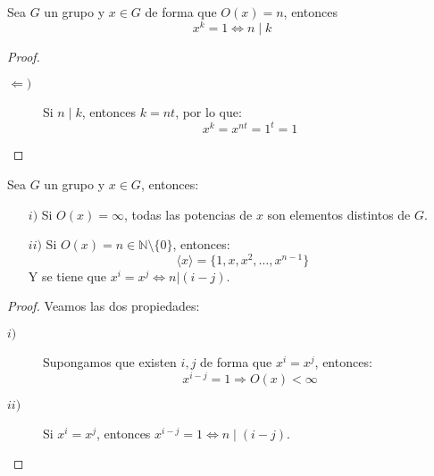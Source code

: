 \begin{prop}
    Sea $G$ un grupo y $x\in G$ de forma que $O(x)=n$, entonces
    \begin{equation*}
        x^k = 1 \Longleftrightarrow n\mid k
    \end{equation*}
    \begin{proof}
        \begin{description}
            \item [$\Longleftarrow)$] Si $n\mid k$, entonces $k = nt$, por lo que:
                \begin{equation*}
                    x^k = x^{nt} = 1^t = 1
                \end{equation*}
        \end{description}
    \end{proof}
\end{prop}

\begin{prop}
    Sea $G$ un grupo y $x\in G$, entonces:
    \begin{enumerate}
        \item[$i)$] Si $O(x)=\infty$, todas las potencias de $x$ son elementos distintos de $G$.
        \item[$ii)$] Si $O(x)=n\in \mathbb{N}\setminus\{0\}$, entonces:
            \begin{equation*}
                \langle x \rangle  = \{1,x,x^2, \ldots,x^{n-1}\}
            \end{equation*}
            Y se tiene que $x^i = x^{j} \Longleftrightarrow n|(i-j)$.
    \end{enumerate}
    \begin{proof} Veamos las dos propiedades:
        \begin{description}
            \item [$i)$] Supongamos que existen $i,j $ de forma que $x^i = x^j$, entonces:
                \begin{equation*}
                    x^{i-j} = 1 \Longrightarrow O(x) < \infty
                \end{equation*}
            \item [$ii)$] Si $x^i = x^j$, entonces $x^{i-j}= 1 \Longleftrightarrow n\mid (i-j)$.
        \end{description}
    \end{proof}
\end{prop}

